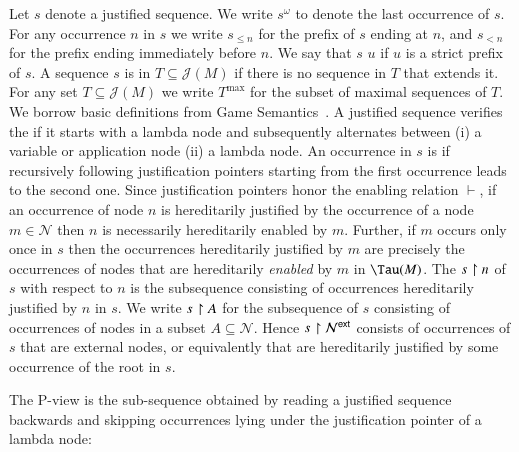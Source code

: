 \documentclass{elsarticle}
\theoremstyle{plain}
\theoremstyle{definition}
\newcommand\Nodes{\mathcal{N}}%
\newcommand{\enables}{\vdash} %
\newcommand{\ctree}{\Tau} %
\newcommand{\ExternalNodes}{\Nodes^{\sf ext}}
\def\justseqset{\mathcal{J}}
\begin{document}
Let $s$ denote a justified sequence. We write $s^\omega$ to denote the last occurrence of $s$. For any occurrence $n$ in $s$ we write $s_{\leq n}$ for the prefix of $s$ ending at $n$, and $s_{<n}$ for the prefix ending immediately before $n$.
We say that $s$  $u$ if $u$ is a strict prefix of $s$.
A sequence $s$ is  in $T\subseteq \justseqset(M)$ if there is no sequence in $T$ that extends it.
%
For any set $T\subseteq \justseqset(M)$ we write $T^{\max}$ for the subset of maximal sequences of $T$.
%
We borrow basic definitions from Game Semantics~\cite{Abr02}. A justified sequence verifies the  if it starts with a lambda node and subsequently alternates between (i) a variable or application node (ii) a lambda node.
An occurrence in $s$ is  if recursively following justification pointers starting from the first occurrence leads to the second one.
Since justification pointers honor the enabling relation $\enables$, if an occurrence of node $n$ is hereditarily justified by the occurrence of a node $m\in\Nodes$ then $n$ is necessarily hereditarily enabled by $m$. Further, if $m$ occurs only once in $s$ then the occurrences hereditarily justified by $m$ are precisely the occurrences of nodes that are hereditarily \emph{enabled} by $m$ in $\ctree(M)$.
%
The  $s\upharpoonright n$ of $s$ with respect to $n$ is the subsequence consisting of occurrences hereditarily justified by $n$ in $s$. We write $s \upharpoonright A$ for the subsequence of $s$ consisting of occurrences of nodes in a subset $A \subseteq \Nodes$.
Hence $s\filter\ExternalNodes$ consists of occurrences of $s$ that are external nodes, or equivalently that are hereditarily justified by some occurrence of the root in $s$.

The P-view is the sub-sequence obtained by reading a justified sequence backwards and skipping occurrences lying under the justification pointer of a lambda node:
\end{document}
